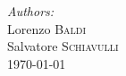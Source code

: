 \begin{titlepage}
\Large \emph{Authors:}\\
Lorenzo \textsc{Baldi}\\ Salvatore \textsc{Schiavulli}\\[3cm] %


{\large \today}\\[3cm] %


 

\vfill %

\end{titlepage}
